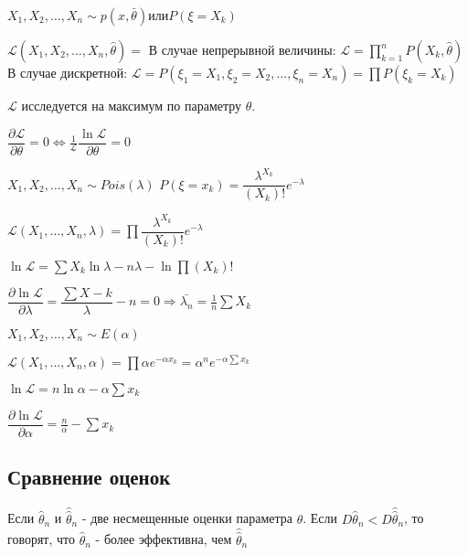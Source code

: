 $X_1, X_2, \dots, X_n \sim p(x, \bar\theta) \text{или} P(\xi = X_k)$

\begin{definition}
  $\mathcal{L} (X_1, X_2, \dots, X_n, \hat\theta) = $
  В случае непрерывной величины: $\mathcal{L} = \prod_{k=1}^n P(X_k, \hat \theta)$
  В случае дискретной: $\mathcal{L} = P(\xi_1 = X_1, \xi_2 = X_2, \dots, \xi_n = X_n) = \prod P(\xi_k = X_k)$

  $\mathcal{L}$ исследуется на максимум по параметру $\theta$.
\end{definition}

$\dfrac{\partial \mathcal{L}}{\partial \theta} = 0 \Leftrightarrow \frac{1}{\mathcal{L}} \dfrac{\ln \mathcal{L}}{\partial \theta} = 0$

\begin{ex}
  $X_1, X_2, \dots, X_n \sim Pois(\lambda)$
  $P(\xi=x_k) = \dfrac{\lambda^{X_k}}{(X_k)!} e^{-\lambda}$

  $\mathcal{L}(X_1, \dots, X_n, \lambda) = \prod \dfrac{\lambda^{X_k}}{(X_k)!} e^{-\lambda}$

  $\ln \mathcal{L} = \sum X_k \ln\lambda - n \lambda - \ln \prod (X_k)!$

  $\dfrac{\partial \ln \mathcal{L}}{\partial \lambda} = \dfrac{\sum X-k}{\lambda} - n = 0 \Rightarrow \bar{\lambda_n} = \frac{1}{n} \sum X_k$
\end{ex}

\begin{ex}
  $X_1, X_2, \dots, X_n \sim E(\alpha)$

  $\mathcal{L}(X_1, \dots, X_n, \alpha) = \prod \alpha e^{-\alpha x_k} = \alpha^n e^{-\alpha \sum x_k}$

  $\ln \mathcal{L} = n \ln\alpha - \alpha \sum x_k$

  $\dfrac{\partial \ln\mathcal{L}}{\partial \alpha} = \frac{n}{\alpha} - \sum x_k$
\end{ex}

\subsection{Сравнение оценок}

\begin{definition}
  Если $\hat \theta_n$ и $\widehat{\widehat{\theta}}_n$ - две несмещенные оценки параметра $\theta$.
  Если $D \hat\theta_n < D \hat\hat\theta_n$, то говорят, что $\hat\theta_n$ - более эффективна, чем $\hat\hat\theta_n$
\end{definition}

